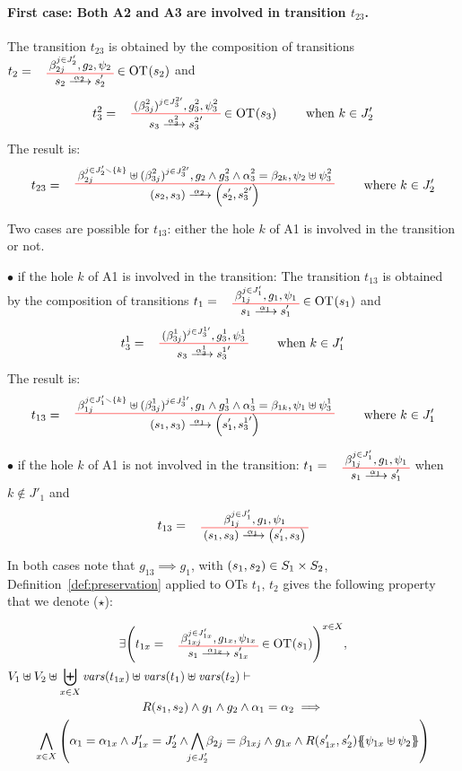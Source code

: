 \documentclass[runningheads]{llncs}
\begin{document}
\begin{enumerate}
\paragraph{First case: Both A2 and A3 are involved in transition $t_{23}$.}
The transition $t_{23}$ is obtained by the composition of  transitions $t_2=\OTx{2}{}{2}{2}\in\fOT{s_2}$ and  \[t_3^2=
\OT{ s_3}{{s^2_3}'}{\alpha_3^2}{   {(\beta^2_{3j})^{j \in J^{2 \prime}_3} }}{ g^2_3 }{ \psi^2_3}\in\fOT{s_3} \qquad \text{ when } k \in J'_{2} 
\] The result is:
\[
t_{23} = \OT{\mpar{s_2, s_3}}{\mpar{s'_2, {s^2_3}'}}{\alpha_2}{\beta_{2j}^{j \in J'_2 \setminus \{k\}} \uplus  {(\beta^2_{3j})^{j \in J^{2 \prime}_3} }}{g_2 \wedge g^2_3 \wedge \alpha^2_3 = \beta_{2k}}{\psi_2 \uplus \psi^2_3} \qquad \text{ where } k \in J'_{2} 
\]

Two cases are possible for $t_{13}$: either the hole $k$ of A1 is involved in the transition or not.

$\bullet$ if  the hole $k$ of A1 is involved in the transition: 
The transition $t_{13}$ is obtained by the composition of  transitions $t_1=\OTx{1}{}{1}{1}\in\fOT{s_1}$ and  \[t_3^1=
\OT{ s_3}{{s^1_3}'}{\alpha_3^1}{   {(\beta^1_{3j})^{j \in J^{1 \prime}_3} }}{ g^1_3 }{ \psi^1_3} \qquad \text{ when } k \in J'_{1} 
\] The result is:
\[
t_{13} = \OT{\mpar{s_1, s_3}}{\mpar{s'_1, {s^1_3}'}}{\alpha_1}{\beta_{1j}^{j \in J'_1 \setminus \{k\}} \uplus  {(\beta^1_{3j})^{j \in J^{1 \prime}_3} }}{g_1 \wedge g^1_3 \wedge \alpha^1_3 = \beta_{1k}}{\psi_1 \uplus \psi^1_3} \qquad \text{ where } k \in J'_{1} 
\]

$\bullet$ if  the hole $k$ of A1 is not involved in the transition:
$t_1=\OTx{1}{}{1}{1}$ when  $k \not\in J'_{1} $
and 
\[
t_{13} = \OT{\mpar{s_1, s_3}}{\mpar{s'_1, {s_3}}}{\alpha_1}{\beta_{1j}^{j \in J'_1}}{g_1}{\psi_1}
\]

\smallskip
In both cases note that $g_{13} \implies g_1$, with  ${\left(s_1, s_2\right)} \in S_1 \times S_2$, Definition~\ref{def:preservation} applied to OTs $t_1,\,t_2$ gives the following property that we denote ($\star$):

\begin{multline*}
\exists 
\mpar{t_{1x} = \OTx{1}{x}{1x}{1x} \in \fOT{s_1}}^{x \in X},\\
  V_1 \uplus V_2 \uplus \biguplus_{x\in X}\fvars{t_{1x}} \uplus \fvars{t_1} \uplus \fvars{t_2} \vdash \hspace{6cm}\\  R\mpar{s_1, s_2} \wedge 	g_1 \wedge g_2 \wedge \alpha_1 = \alpha_2 
\implies \\
\bigwedge_{x\in X}
\mpar{
\alpha_1=\alpha_{1 x}  \land J'_{1x}= J'_2 \land \bigwedge_\subbox{j \in J'_2 } \beta_{2j} = \beta_{1xj}\land g_{1 x}\land
 R\mpar{s'_{1 x}, s'_2}\psubst{\psi_{1 x} \uplus \psi_2}}
\end{multline*}


\end{enumerate}
\end{document}
